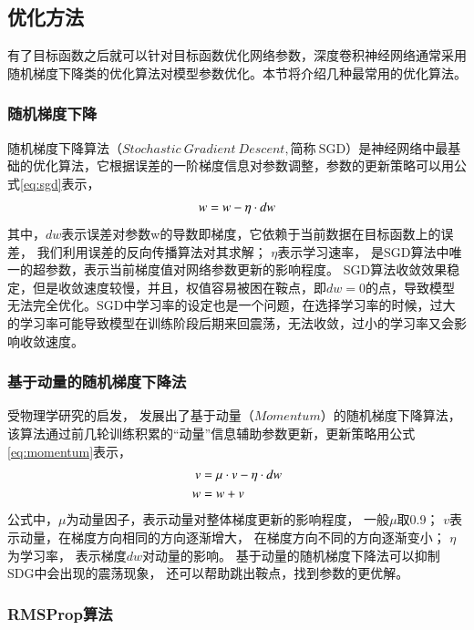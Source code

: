 \subsection{优化方法}

有了目标函数之后就可以针对目标函数优化网络参数，深度卷积神经网络通常采用随机梯度下降类的优化算法对模型参数优化。本节将介绍几种最常用的优化算法。

\subsubsection{随机梯度下降}

随机梯度下降算法（$Stochastic~Gradient~Descent,\mbox{简称}~\mbox{SGD}$）是神经网络中最基础的优化算法，它根据误差的一阶梯度信息对参数调整，参数的更新策略可以用公式\eqref{eq:sgd}表示，
\begin{equation}
\centering
w=w-\eta \cdot dw
\label{eq:sgd}
\end{equation}
其中，$dw$表示误差对参数w的导数即梯度，它依赖于当前数据在目标函数上的误差，
我们利用误差的反向传播算法对其求解；
$\eta$表示学习速率，
是SGD算法中唯一的超参数，表示当前梯度值对网络参数更新的影响程度。
SGD算法收敛效果稳定，但是收敛速度较慢，并且，权值容易被困在鞍点，即$dw=0$的点，导致模型无法完全优化。SGD中学习率的设定也是一个问题，在选择学习率的时候，过大的学习率可能导致模型在训练阶段后期来回震荡，无法收敛，过小的学习率又会影响收敛速度。

\subsubsection{基于动量的随机梯度下降法}

受物理学研究的启发，
发展出了基于动量\cite{qian1999momentum}（$Momentum$）的随机梯度下降算法，
该算法通过前几轮训练积累的“动量”信息辅助参数更新，更新策略用公式\eqref{eq:momentum}表示，
\begin{equation}
\begin{aligned}
\centering
v & =\mu \cdot v-\eta \cdot dw \\
w & =w+v
\end{aligned}
\label{eq:momentum}
\end{equation}
公式中，$\mu$为动量因子，表示动量对整体梯度更新的影响程度，
一般$\mu$取0.9；
$v$表示动量，在梯度方向相同的方向逐渐增大，
在梯度方向不同的方向逐渐变小；
$\eta$为学习率，
表示梯度$dw$对动量的影响。
基于动量的随机梯度下降法可以抑制SDG中会出现的震荡现象，
还可以帮助跳出鞍点，找到参数的更优解。

\subsubsection{RMSProp算法}

